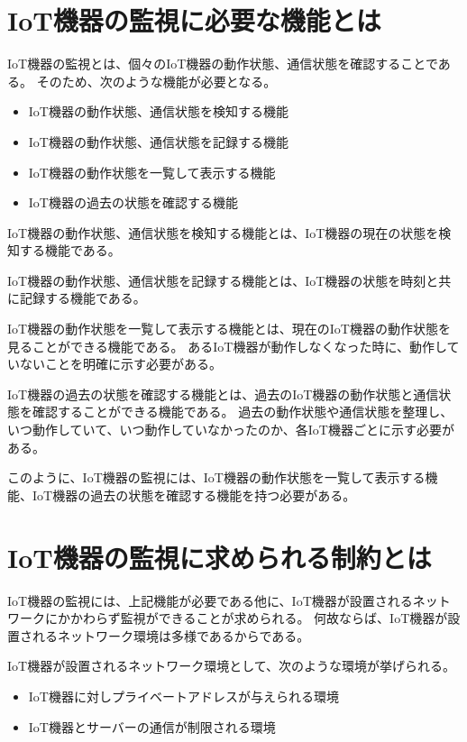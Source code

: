\section{IoT機器の監視に必要な機能とは}%
IoT機器の監視とは、個々のIoT機器の動作状態、通信状態を確認することである。
そのため、次のような機能が必要となる。
\begin{itemize}
	\item IoT機器の動作状態、通信状態を検知する機能
	\item IoT機器の動作状態、通信状態を記録する機能
	\item IoT機器の動作状態を一覧して表示する機能
	\item IoT機器の過去の状態を確認する機能
\end{itemize}

IoT機器の動作状態、通信状態を検知する機能とは、IoT機器の現在の状態を検知する機能である。

IoT機器の動作状態、通信状態を記録する機能とは、IoT機器の状態を時刻と共に記録する機能である。

IoT機器の動作状態を一覧して表示する機能とは、現在のIoT機器の動作状態を見ることができる機能である。
あるIoT機器が動作しなくなった時に、動作していないことを明確に示す必要がある。
\medskip

IoT機器の過去の状態を確認する機能とは、過去のIoT機器の動作状態と通信状態を確認することができる機能である。
過去の動作状態や通信状態を整理し、いつ動作していて、いつ動作していなかったのか、各IoT機器ごとに示す必要がある。
\medskip

このように、IoT機器の監視には、IoT機器の動作状態を一覧して表示する機能、IoT機器の過去の状態を確認する機能を持つ必要がある。

\section{IoT機器の監視に求められる制約とは}%
IoT機器の監視には、上記機能が必要である他に、IoT機器が設置されるネットワークにかかわらず監視ができることが求められる。
何故ならば、IoT機器が設置されるネットワーク環境は多様であるからである。
\medskip

IoT機器が設置されるネットワーク環境として、次のような環境が挙げられる。
\begin{itemize}
	\item IoT機器に対しプライベートアドレスが与えられる環境
	\item IoT機器とサーバーの通信が制限される環境
\end{itemize}

